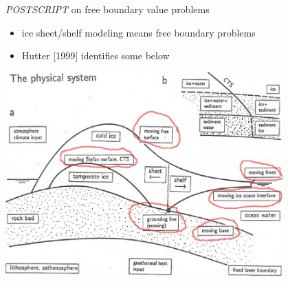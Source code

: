 

\begin{frame}{\emph{POSTSCRIPT} on free boundary value problems}

\begin{itemize}
\item ice sheet/shelf modeling means free boundary problems
\item Hutter [1999]\nocite{HutterFreeBoundary} identifies some below
\end{itemize}
\begin{center}
  \includegraphics[width=0.8\textwidth]{photos/freehutter}
\end{center}
\end{frame}



